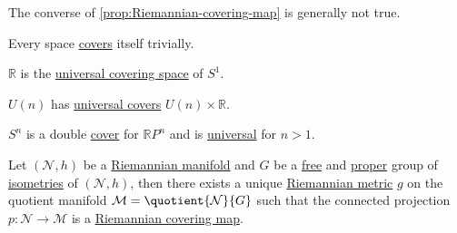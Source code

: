 \begin{note}
	The converse of \autoref{prop:Riemannian-covering-map} is generally not true.
\end{note}

\begin{eg}
	Every space \hyperref[def:covering-map]{covers} itself trivially.
\end{eg}

\begin{eg}
	\(\mathbb{R} \) is the \hyperref[not:universal-covering-space]{universal covering space} of \(S^1\).
\end{eg}

\begin{eg}
	\(U(n)\) has \hyperref[not:universal-covering-space]{universal covers} \(U(n) \times \mathbb{R} \).
\end{eg}

\begin{eg}
	\(S^n\) is a double \hyperref[not:covering-space]{cover} for \(\mathbb{R} P^n\) and is \hyperref[not:universal-covering-space]{universal} for \(n > 1\).
\end{eg}

\begin{proposition}
	Let \((\mathcal{N}, h )\) be a \hyperref[def:Riemannian-manifold]{Riemannian manifold} and \(G\) be a \href{https://en.wikipedia.org/wiki/Free_group}{free} and \href{https://mathworld.wolfram.com/ProperGroupAction.html}{proper} group of \hyperref[def:isometry]{isometries} of \((\mathcal{N} , h)\), then there exists a unique \hyperref[def:Riemannian-metric]{Riemannian metric} \(g\) on the quotient manifold \(\mathcal{M} = \quotient{\mathcal{N} }{G} \) such that the connected projection \(p\colon \mathcal{N}  \to  \mathcal{M} \) is a \hyperref[def:Riemannian-covering-map]{Riemannian covering map}.
\end{proposition}